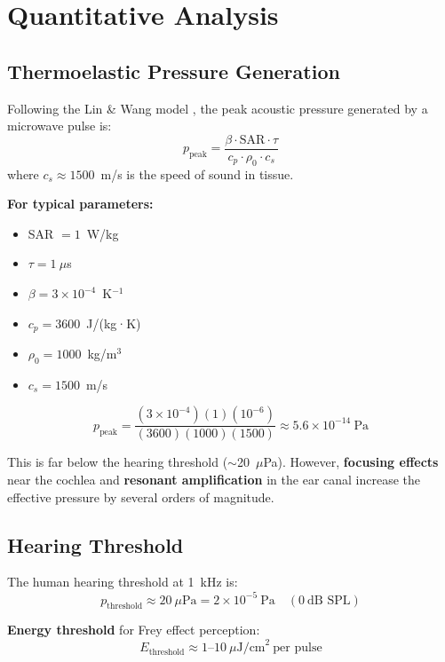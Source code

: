 \section{Quantitative Analysis}

\subsection{Thermoelastic Pressure Generation}

Following the Lin \& Wang model \cite{Lin1980}, the peak acoustic pressure generated by a microwave pulse is:
\begin{equation}
p_{\text{peak}} = \frac{\beta \cdot \text{SAR} \cdot \tau}{c_p \cdot \rho_0 \cdot c_s}
\end{equation}
where $c_s \approx 1500$~m/s is the speed of sound in tissue.

\textbf{For typical parameters:}
\begin{itemize}
\item SAR $= 1$~W/kg
\item $\tau = 1~\mu$s
\item $\beta = 3 \times 10^{-4}$~K$^{-1}$
\item $c_p = 3600$~J/(kg·K)
\item $\rho_0 = 1000$~kg/m$^3$
\item $c_s = 1500$~m/s
\end{itemize}

\begin{equation}
p_{\text{peak}} = \frac{(3 \times 10^{-4})(1)(10^{-6})}{(3600)(1000)(1500)} \approx 5.6 \times 10^{-14}~\text{Pa}
\end{equation}

This is far below the hearing threshold ($\sim$20~$\mu$Pa). However, \textbf{focusing effects} near the cochlea and \textbf{resonant amplification} in the ear canal increase the effective pressure by several orders of magnitude.

\subsection{Hearing Threshold}

The human hearing threshold at 1~kHz is:
\begin{equation}
p_{\text{threshold}} \approx 20~\mu\text{Pa} = 2 \times 10^{-5}~\text{Pa} \quad (0~\text{dB SPL})
\end{equation}

\textbf{Energy threshold} for Frey effect perception:
\begin{equation}
E_{\text{threshold}} \approx 1\text{--}10~\mu\text{J/cm}^2~\text{per pulse}
\end{equation}

